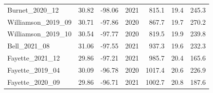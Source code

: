 \begin{table}
{\begin{tabular}{p{5cm}p{3cm}p{3cm}p{3cm}p{3cm}p{3cm}p{3cm}}
            \multicolumn{1}{l}{Burnet\_2020\_12} 
            & \multicolumn{1}{r}{30.82}
            & \multicolumn{1}{r}{-98.06}
            & \multicolumn{1}{r}{2021}
            & \multicolumn{1}{r}{815.1}
            & \multicolumn{1}{r}{19.4}
            & \multicolumn{1}{r}{245.3}
            \\
            
            \multicolumn{1}{l}{Williamson\_2019\_09} 
            & \multicolumn{1}{r}{30.71}
            & \multicolumn{1}{r}{-97.86}
            & \multicolumn{1}{r}{2020}
            & \multicolumn{1}{r}{867.7}
            & \multicolumn{1}{r}{19.7}
            & \multicolumn{1}{r}{270.2}
            \\

            \multicolumn{1}{l}{Williamson\_2019\_10} 
            & \multicolumn{1}{r}{30.54}
            & \multicolumn{1}{r}{-97.77}
            & \multicolumn{1}{r}{2020}
            & \multicolumn{1}{r}{819.5}
            & \multicolumn{1}{r}{19.9}
            & \multicolumn{1}{r}{239.8}
            \\

            \multicolumn{1}{l}{Bell\_2021\_08} 
            & \multicolumn{1}{r}{31.06}
            & \multicolumn{1}{r}{-97.55}
            & \multicolumn{1}{r}{2021}
            & \multicolumn{1}{r}{937.3}
            & \multicolumn{1}{r}{19.6}
            & \multicolumn{1}{r}{232.3}
            \\

            \multicolumn{1}{l}{Fayette\_2021\_12} 
            & \multicolumn{1}{r}{29.86}
            & \multicolumn{1}{r}{-97.21}
            & \multicolumn{1}{r}{2021}
            & \multicolumn{1}{r}{985.7}
            & \multicolumn{1}{r}{20.4}
            & \multicolumn{1}{r}{165.6}
            \\

            \multicolumn{1}{l}{Fayette\_2019\_04} 
            & \multicolumn{1}{r}{30.09}
            & \multicolumn{1}{r}{-96.78}
            & \multicolumn{1}{r}{2020}
            & \multicolumn{1}{r}{1017.4}
            & \multicolumn{1}{r}{20.6}
            & \multicolumn{1}{r}{226.9}
            \\

            \multicolumn{1}{l}{Fayette\_2020\_09} 
            & \multicolumn{1}{r}{29.86}
            & \multicolumn{1}{r}{-96.71}
            & \multicolumn{1}{r}{2021}
            & \multicolumn{1}{r}{1002.7}
            & \multicolumn{1}{r}{20.8}
            & \multicolumn{1}{r}{187.6}
            \\


\end{tabular}}
\end{table}
